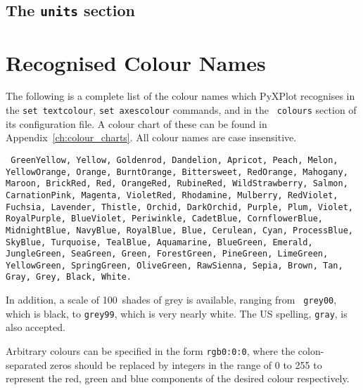 \subsection{The {\tt units} section}
\label{sec:configfile_units}


\section{Recognised Colour Names}
\label{sec:colour_names}

The following is a complete list of the colour names which PyXPlot recognises
in the {\tt set textcolour}, {\tt set axescolour} commands, and in the {\tt
colours} section of its configuration file.  A colour chart of these can be
found in Appendix~\ref{ch:colour_charts}.  All colour names are case
insensitive.

\vspace{5mm}\noindent
{}
{\tt
GreenYellow, Yellow, Goldenrod, Dandelion, Apricot, Peach, Melon, YellowOrange, Orange, BurntOrange, Bittersweet, RedOrange, Mahogany, Maroon, BrickRed, Red, OrangeRed, RubineRed, WildStrawberry, Salmon, CarnationPink, Magenta, VioletRed, Rhodamine, Mulberry, RedViolet, Fuchsia, Lavender, Thistle, Orchid, DarkOrchid, Purple, Plum, Violet, RoyalPurple, BlueViolet, Periwinkle, CadetBlue, CornflowerBlue, MidnightBlue, NavyBlue, RoyalBlue, Blue, Cerulean, Cyan, ProcessBlue, SkyBlue, Turquoise, TealBlue, Aquamarine, BlueGreen, Emerald, JungleGreen, SeaGreen, Green, ForestGreen, PineGreen, LimeGreen, YellowGreen, SpringGreen, OliveGreen, RawSienna, Sepia, Brown, Tan, Gray, Grey, Black, White.
}

\vspace{5mm}
In addition, a scale of 100~shades of grey is available, ranging from {\tt
grey00}, which is black, to {\tt grey99}, which is very nearly white.  The US
spelling, {\tt gray}, is also accepted.

Arbitrary colours can be specified in the form {\tt rgb0:0:0}, where the
colon-separated zeros should be replaced by integers in the range of 0 to 255
to represent the red, green and blue components of the desired colour
respectively.

